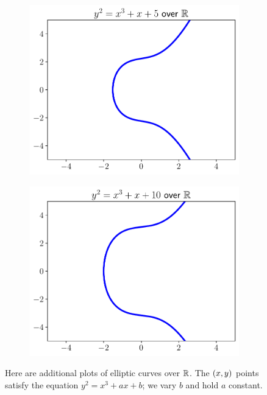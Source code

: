 \begin{figure}[p]
    \begin{subfigure}[t]{0.45\textwidth}
    \includegraphics[width=\textwidth]{plots/ec_reals/ec_reals_1_5.pdf}
    \end{subfigure}
    \begin{subfigure}[t]{0.45\textwidth}
    \includegraphics[width=\textwidth]{plots/ec_reals/ec_reals_1_10.pdf}
    \end{subfigure}
    \caption[Plots of elliptic curves over the reals 2]{Here
        are additional plots of \glspl{elliptic curve} over $\mathbb{R}$.
        The $\left( x,y \right)$ points satisfy the equation
        $y^{2} = x^{3} + ax + b$;
        we vary $b$ and hold $a$ constant.}
    \label{fig:ec_real_plots_2}
\end{figure}
